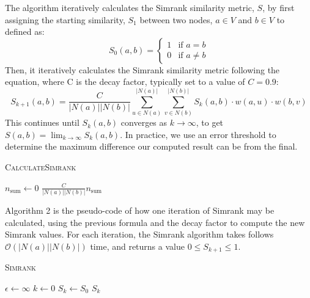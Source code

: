 \documentclass[fontsize=11pt]{article}
\begin{document}
The algorithm iteratively calculates the Simrank similarity metric, $S$, by first assigning the starting similarity, $S_1$ between two nodes, $a \in V$ and $b \in V$ to defined as:
\[S_0(a, b) = \begin{cases}
    1 & \text{if } a = b \\
    0 & \text{if } a \neq b
\end{cases}\]
Then, it iteratively calculates the Simrank similarity metric following the equation, where C is the decay factor, typically set to a value of $C=0.9$:
\[
S_{k+1}(a, b) = \frac{C}{\lvert N(a) \rvert \lvert N(b) \rvert} \sum^{\lvert N(a) \rvert}_{u \in N(a)} \sum^{\lvert N(b) \rvert}_{v \in N(b)} S_k(a, b) \cdot w(a, u) \cdot w(b, v)
\]
This continues until $S_k(a, b)$ converges as $k \to \infty$, to get $S(a, b) = \lim_{k \to \infty}S_k(a, b)$. In practice, we use an error threshold to determine the maximum difference our computed result can be from the final. 

\begin{algorithm}[H]
    \setcounter{AlgoLine}{0}
    \caption{\textsc{CalculateSimrank}}
    $n_{\text{sum}} \gets 0$\;
    \Return $\frac{C}{\lvert N(a) \rvert \lvert N(b) \rvert} n_{\text{sum}}$\;
\end{algorithm}

Algorithm 2 is the pseudo-code of how one iteration of Simrank may be calculated, using the previous formula and the decay factor to compute the new Simrank values. For each iteration, the Simrank algorithm takes follows $\mathcal{O}(\lvert N(a) \rvert \lvert N(b) \rvert)$ time, and returns a value $0 \leq S_{k+1} \leq 1$. 

\begin{algorithm}[H]
    \setcounter{AlgoLine}{0}
    \caption{\textsc{Simrank}}
    $\epsilon \gets \infty$\;
    $k \gets 0$\;
    $S_k \gets S_0$\;
    \Return $S_k$\;
\end{algorithm}
\end{document}
